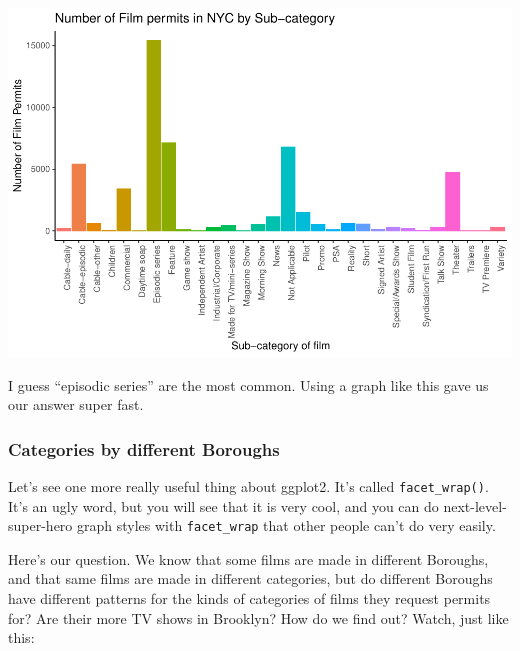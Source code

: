 \documentclass[]{book}
\begin{document}
\includegraphics{Statistics_Lab_files/figure-latex/1subcategory-1.pdf}

I guess ``episodic series'' are the most common. Using a graph like this
gave us our answer super fast.

\subsubsection{Categories by different
Boroughs}\label{categories-by-different-boroughs}

Let's see one more really useful thing about ggplot2. It's called
\texttt{facet\_wrap()}. It's an ugly word, but you will see that it is
very cool, and you can do next-level-super-hero graph styles with
\texttt{facet\_wrap} that other people can't do very easily.

Here's our question. We know that some films are made in different
Boroughs, and that same films are made in different categories, but do
different Boroughs have different patterns for the kinds of categories
of films they request permits for? Are their more TV shows in Brooklyn?
How do we find out? Watch, just like this:
\end{document}
